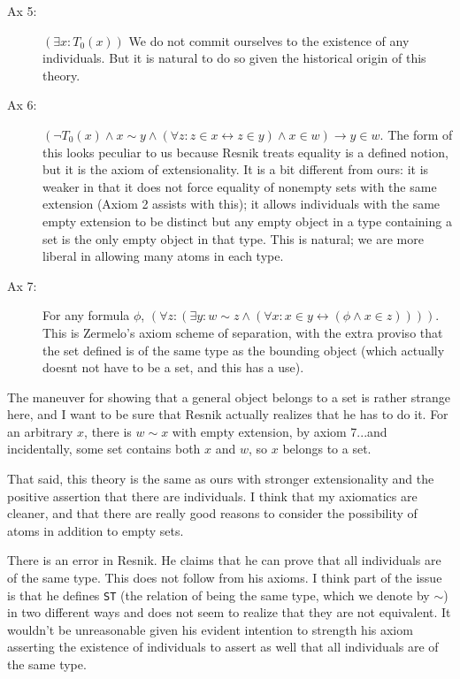 \documentclass[12pt]{article}
\begin{document}
\begin{description}
\item[Ax 5:]  $(\exists x:T_0(x))$  We do not commit ourselves to the existence of any individuals.  But it is natural to do so given the historical origin of this theory.

\item[Ax 6:]  $(\neg T_0(x) \wedge x \sim y \wedge (\forall z:z \in x \leftrightarrow z \in y) \wedge x \in w) \rightarrow y \in w$.  The form of this looks peculiar to us because Resnik treats equality is a defined notion, but it is the axiom of extensionality.  It is a bit different from ours:  it is weaker in that it does not force equality of nonempty sets with the same extension (Axiom 2 assists with this);  it allows individuals with the same empty extension to be distinct but any empty object in a type containing a set is the only empty object in that type.  This is natural;  we are more liberal in allowing many atoms in each type.

\item[Ax 7:] For any formula $\phi$, $(\forall z:(\exists y:w \sim z \wedge (\forall x:x \in y \leftrightarrow (\phi \wedge x \in z))))$.  This is Zermelo's axiom scheme of separation, with the extra proviso that the set defined is of the same type as the bounding object (which actually doesnt not have to be a set, and this has a use).

\end{description}

The maneuver for showing that a general object belongs to a set is rather strange here, and I want to be sure that Resnik actually realizes that he has to do it.
For an arbitrary $x$, there is $w \sim x$ with empty extension, by axiom 7...and incidentally, some set contains both $x$ and $w$, so $x$ belongs to a set.

That said, this theory is the same as ours with stronger extensionality and the positive assertion that there are individuals.  I think that my axiomatics are cleaner, and that there are really good reasons to consider the possibility of atoms in addition to empty sets.

There is an error in Resnik.  He claims that he can prove that all individuals are of the same type.  This does not follow from his axioms.  I think part of the issue is that he defines {\tt ST} (the relation of being the same type, which we denote by $\sim$) in two different ways and does not seem to realize that they are not equivalent.  It wouldn't be unreasonable given his evident intention to strength his axiom asserting the existence of individuals to assert as well that all individuals are of the same type.
\end{document}

